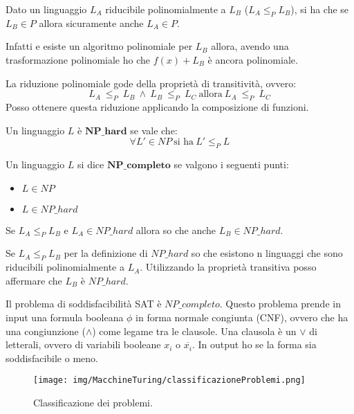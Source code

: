 \begin{teorema}
    Dato un linguaggio $L_A$ riducibile polinomialmente a $L_B$ ($L_A \leq_P L_B$), 
    si ha che se $L_B \in P$ allora sicuramente anche $L_A \in P$.
\end{teorema}
\begin{dimostrazione}
    Infatti e esiste un algoritmo polinomiale per $L_B$ allora, avendo una 
    trasformazione polinomiale ho che $f(x) + L_B$ è ancora polinomiale.
\end{dimostrazione}
\begin{teorema}
    La riduzione polinomiale gode della proprietà di transitività, ovvero:
    \begin{equation}
        L_A \ \leq_P \ L_B \ \land \ L_B \ \leq_P \ L_C \ \text{allora} \ L_A \ \leq_P \ L_C
    \end{equation}
    Posso ottenere questa riduzione applicando la composizione di funzioni.
\end{teorema}
\begin{definizione}
    Un linguaggio $L$ è $\textbf{NP}\_\textbf{hard}$ se vale che:
    \begin{equation}
        \forall L' \in NP \ \text{si ha} \ L' \leq_P L
    \end{equation}
\end{definizione}
\begin{definizione}
    Un linguaggio $L$ si dice $\textbf{NP}\_\textbf{completo}$ se valgono i 
    seguenti punti:
    \begin{itemize}
        \item $L \in NP$
        \item $L \in NP\_hard$
    \end{itemize}
\end{definizione}
\begin{teorema}
    Se $L_A \leq_P L_B$ e $L_A \in NP\_hard$ allora so che anche $L_B \in NP\_hard$.
\end{teorema}
\begin{dimostrazione}
    Se $L_A \leq_P L_B$ per la definizione di $NP\_hard$ so che esistono n linguaggi 
    che sono riducibili polinomialmente a $L_A$. Utilizzando la proprietà transitiva 
    posso affermare che $L_B$ è $NP\_hard$.
\end{dimostrazione}
\begin{teorema}
    Il problema di soddisfacibilità SAT è $NP\_completo$. Questo problema prende 
    in input una formula booleana $\phi$ in forma normale congiunta (CNF), ovvero 
    che ha una congiunzione ($\land$) come legame tra le clausole. Una clausola 
    è un $\lor$ di letterali, ovvero di variabili booleane $x_i$ o $\overline{x_i}$. 
    In output ho se la forma sia soddisfacibile o meno.   
\end{teorema}
\begin{figure}[!ht]
    \centering
    \texttt{[image: img/MacchineTuring/classificazioneProblemi.png]}
    \caption{Classificazione dei problemi.}
\end{figure}